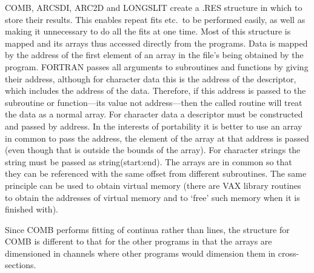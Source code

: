 COMB, ARCSDI, ARC2D and LONGSLIT create a .RES structure in which to
store their results.
This enables repeat fits etc.\ to be performed easily, as well as making
it unnecessary to do all the fits at one time.
Most of this structure is mapped and its arrays thus accessed directly
from the programs.
Data is mapped by the address of the first element of an array in the
file's being obtained by the program.
FORTRAN passes all arguments to subroutines and functions by giving
their address, although for character data this is the address of the
descriptor, which includes the address of the data.
Therefore, if this address is passed to the subroutine or function---its
value not address---then the called routine will treat the data as a
normal array.
For character data a descriptor must be constructed and passed by
address.
In the interests of portability it is better to use an array in common
to pass the address, the element of the array at that address is passed
(even though that is outside the bounds of the array). For character
strings the string must be passed as string(start:end). The arrays are
in common so that they can be referenced with the same offset from
different subroutines.
The same principle can be used to obtain virtual memory
(there are VAX library routines to obtain the addresses of virtual
memory and to `free' such memory when it is finished with).

Since COMB performs fitting of continua rather than lines, the structure
for COMB is different to that for the other programs in that the arrays
are dimensioned in channels where other programs would dimension them in
cross-sections.

